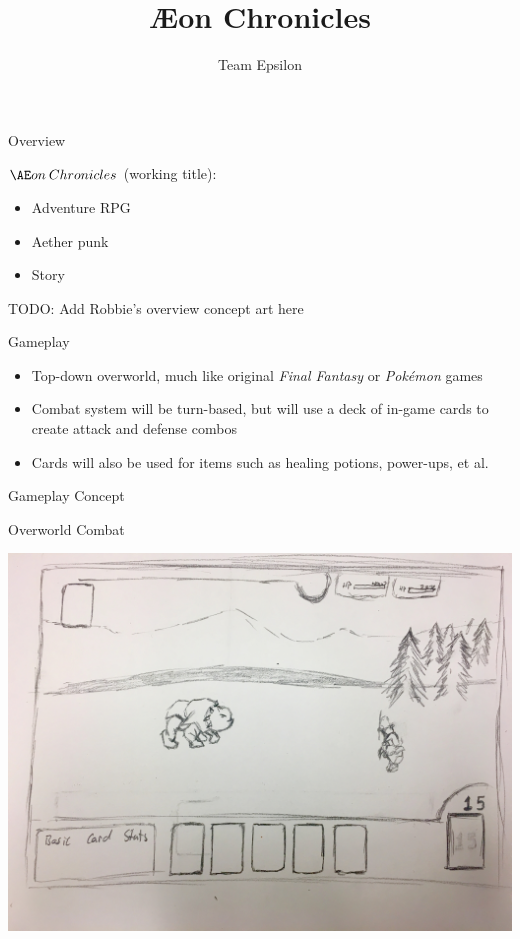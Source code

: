 \documentclass{teamepsilon}
\title{{\AE}on Chronicles}
\author{Team Epsilon}
\institute{Colorado School of Mines}
\begin{document}
\begin{frame}{Overview}
    \begin{minipage}{0.55\textwidth}
        $\AE on\:Chronicles$ (working title):
        \begin{itemize}
            \item Adventure RPG
            \item Aether punk
            \item Story
        \end{itemize}
    \end{minipage}%
    \begin{minipage}{0.45\textwidth}
        TODO: Add Robbie's overview concept art here
    \end{minipage}
\end{frame}

\begin{frame}{Gameplay}
    \begin{itemize}
        \item Top-down overworld, much like original \textit{Final Fantasy}
            or \textit{Pok\'emon} games
        \item Combat system will be turn-based, but will use a deck of in-game
            cards to create attack and defense combos
        \item Cards will also be used for items such as healing potions,
            power-ups, et al.
    \end{itemize}
\end{frame}

\begin{frame}{Gameplay Concept}

    Overworld \hfill Combat \\
    \begin{minipage}{0.65\textwidth}
        \includegraphics[height=\textheight-3em]{graphics/combat}
    \end{minipage}%
\end{frame}
\end{document}
